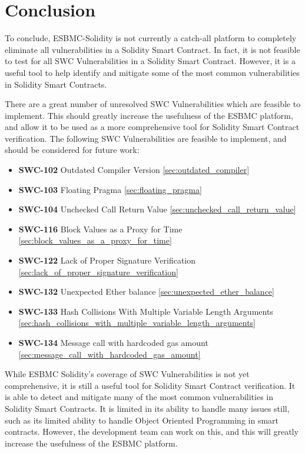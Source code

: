 \chapter{Conclusion}
\label{cha:conclusion}

To conclude, ESBMC-Solidity is not currently a catch-all platform to completely eliminate all vulnerabilities in a Solidity Smart Contract. In fact, it is not feasible to test for all SWC Vulnerabilities in a Solidity Smart Contract. However, it is a useful tool to help identify and mitigate some of the most common vulnerabilities in Solidity Smart Contracts.

There are a great number of unresolved SWC Vulnerabilities which are feasible to implement. This should greatly increase the usefulness of the ESBMC platform, and allow it to be used as a more comprehensive tool for Solidity Smart Contract verification. The following SWC Vulnerabilities are feasible to implement, and should be considered for future work:

\begin{itemize}
    \item \textbf{SWC-102} Outdated Compiler Version \ref{sec:outdated_compiler}
    \item \textbf{SWC-103} Floating Pragma \ref{sec:floating_pragma}
    \item \textbf{SWC-104} Unchecked Call Return Value \ref{sec:unchecked_call_return_value}
    \item \textbf{SWC-116} Block Values as a Proxy for Time \ref{sec:block_values_as_a_proxy_for_time}
    \item \textbf{SWC-122} Lack of Proper Signature Verification \ref{sec:lack_of_proper_signature_verification}
    \item \textbf{SWC-132} Unexpected Ether balance \ref{sec:unexpected_ether_balance}
    \item \textbf{SWC-133} Hash Collisions With Multiple Variable Length Arguments \ref{sec:hash_collisions_with_multiple_variable_length_arguments}
    \item \textbf{SWC-134} Message call with hardcoded gas amount \ref{sec:message_call_with_hardcoded_gas_amount}
\end{itemize}

While ESBMC Solidity's coverage of SWC Vulnerabilities is not yet comprehensive, it is still a useful tool for Solidity Smart Contract verification. It is able to detect and mitigate many of the most common vulnerabilities in Solidity Smart Contracts. It is limited in its ability to handle many issues still, such as its limited ability to handle Object Oriented Programming in smart contracts. However, the development team can work on this, and this will greatly increase the usefulness of the ESBMC platform.
